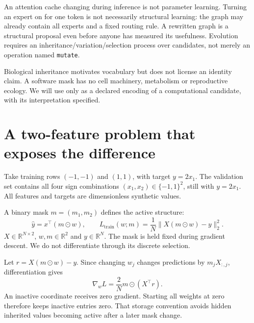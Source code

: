 
An attention cache changing during inference is not parameter learning.
Turning an expert on for one token is not necessarily structural learning:
the graph may already contain all experts and a fixed routing rule.
A rewritten graph is a structural proposal even before anyone has measured
its usefulness. Evolution requires an inheritance/variation/selection
process over candidates, not merely an operation named \texttt{mutate}.

Biological inheritance motivates vocabulary but does not license an
identity claim. A software mask has no cell machinery, metabolism or
reproductive ecology. We will use  only as a declared
encoding of a computational candidate, with its interpretation specified.

\section{A two-feature problem that exposes the difference}
Take training rows $(-1,-1)$ and $(1,1)$, with target $y=2x_1$.
The validation set contains all four sign combinations
$(x_1,x_2)\in\{-1,1\}^2$, still with $y=2x_1$.
All features and targets are dimensionless synthetic values.

A binary mask $m=(m_1,m_2)$ defines the active structure:
\begin{equation}
 \widehat y=x^\top(m\odot w),\qquad
 L_{\mathrm{train}}(w;m)=\frac1N\|X(m\odot w)-y\|_2^2.
 \label{eq:model}
\end{equation}
$X\in\mathbb R^{N\times2}$, $w,m\in\mathbb R^2$ and $y\in\mathbb R^N$.
The mask is held fixed during gradient descent. We do not differentiate
through its discrete selection.


Let $r=X(m\odot w)-y$. Since changing $w_j$ changes predictions by
$m_jX_{:,j}$, differentiation gives
\begin{equation}
 \nabla_wL=\frac2N m\odot(X^\top r).
 \label{eq:gradient}
\end{equation}
An inactive coordinate receives zero gradient. Starting all weights at
zero therefore keeps inactive entries zero. That storage convention avoids
hidden inherited values becoming active after a later mask change.


